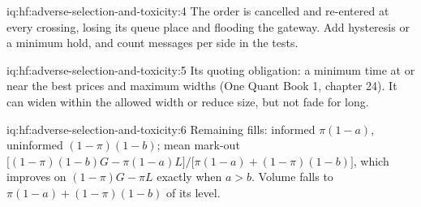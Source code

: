 \begin{solution}{iq:hf:adverse-selection-and-toxicity:4}
The order is cancelled and re-entered at every crossing, losing its queue place and flooding the gateway. Add hysteresis or a minimum hold, and
count messages per side in the tests.
\end{solution}

\begin{solution}{iq:hf:adverse-selection-and-toxicity:5}
Its quoting obligation: a minimum time at or near the best prices and maximum widths (One Quant Book 1, chapter 24). It can widen within the
allowed width or reduce size, but not fade for long.
\end{solution}

\begin{solution}{iq:hf:adverse-selection-and-toxicity:6}
Remaining fills: informed $\pi(1-a)$, uninformed $(1-\pi)(1-b)$; mean mark-out $\bigl[(1-\pi)(1-b)G-\pi(1-a)L\bigr]/\bigl[\pi(1-a)+(1-\pi)(1-b)\bigr]$,
which improves on $(1-\pi)G-\pi L$ exactly when $a>b$. Volume falls to $\pi(1-a)+(1-\pi)(1-b)$ of its level.
\end{solution}
